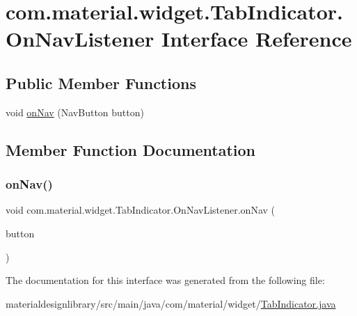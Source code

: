 \hypertarget{interfacecom_1_1material_1_1widget_1_1_tab_indicator_1_1_on_nav_listener}{}\section{com.\+material.\+widget.\+Tab\+Indicator.\+On\+Nav\+Listener Interface Reference}
\label{interfacecom_1_1material_1_1widget_1_1_tab_indicator_1_1_on_nav_listener}
\subsection*{Public Member Functions}
\begin{DoxyCompactItemize}
\item 
void \hyperlink{interfacecom_1_1material_1_1widget_1_1_tab_indicator_1_1_on_nav_listener_aa414f6b44b1e7cc84e73644ae8384d20}{on\+Nav} (Nav\+Button button)
\end{DoxyCompactItemize}


\subsection{Member Function Documentation}
\mbox{\label{interfacecom_1_1material_1_1widget_1_1_tab_indicator_1_1_on_nav_listener_aa414f6b44b1e7cc84e73644ae8384d20}} 
\subsubsection{\texorpdfstring{on\+Nav()}{onNav()}}
{\footnotesize\ttfamily void com.\+material.\+widget.\+Tab\+Indicator.\+On\+Nav\+Listener.\+on\+Nav (\begin{DoxyParamCaption}\item[{Nav\+Button}]{button }\end{DoxyParamCaption})}



The documentation for this interface was generated from the following file\+:\begin{DoxyCompactItemize}
\item 
materialdesignlibrary/src/main/java/com/material/widget/\hyperlink{_tab_indicator_8java}{Tab\+Indicator.\+java}\end{DoxyCompactItemize}

